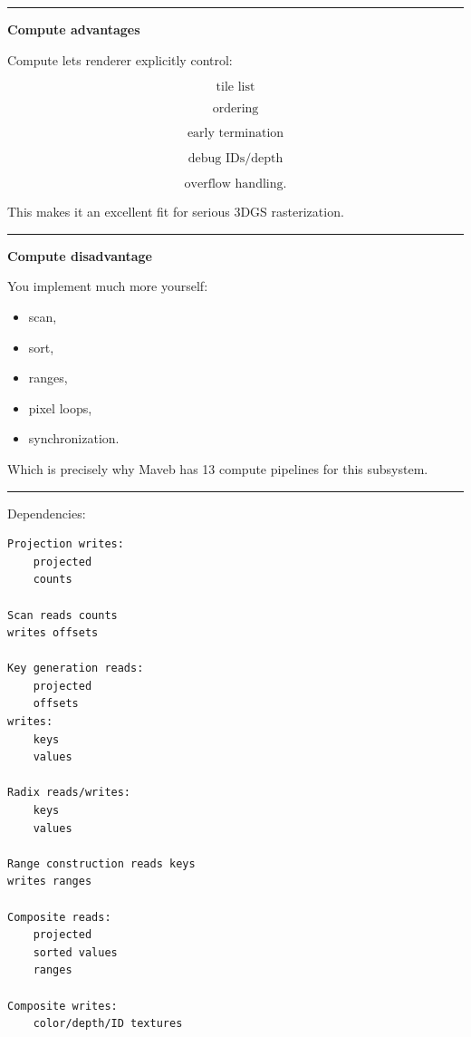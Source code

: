 \begin{center}\rule{0.5\linewidth}{0.5pt}\end{center}

\textbf{Compute advantages}

Compute lets renderer explicitly control:

\[
\text{tile list}
\]

\[
\text{ordering}
\]

\[
\text{early termination}
\]

\[
\text{debug IDs/depth}
\]

\[
\text{overflow handling}.
\]

This makes it an excellent fit for serious 3DGS rasterization.

\begin{center}\rule{0.5\linewidth}{0.5pt}\end{center}

\textbf{Compute disadvantage}

You implement much more yourself:

\begin{itemize}
\tightlist
\item
  scan,
\item
  sort,
\item
  ranges,
\item
  pixel loops,
\item
  synchronization.
\end{itemize}

Which is precisely why Maveb has 13 compute pipelines for this subsystem.

\begin{center}\rule{0.5\linewidth}{0.5pt}\end{center}

Dependencies:

\protect{}\label{sd09sx}%
\begin{verbatim}
Projection writes:
    projected
    counts

Scan reads counts
writes offsets

Key generation reads:
    projected
    offsets
writes:
    keys
    values

Radix reads/writes:
    keys
    values

Range construction reads keys
writes ranges

Composite reads:
    projected
    sorted values
    ranges

Composite writes:
    color/depth/ID textures
\end{verbatim}

